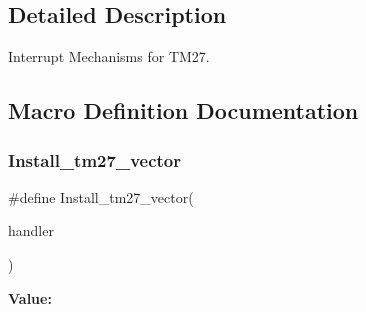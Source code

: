 \subsection{Detailed Description}
Interrupt Mechanisms for T\+M27. 



\subsection{Macro Definition Documentation}
\mbox{\label{group__ezkit533__tm27_gafb2d35f87c2bc11dcc6c700e9abbc183}} 
\subsubsection{\texorpdfstring{Install\_tm27\_vector}{Install\_tm27\_vector}}
{\footnotesize\ttfamily \#define Install\+\_\+tm27\+\_\+vector(\begin{DoxyParamCaption}\item[{}]{handler }\end{DoxyParamCaption})}

{\bfseries Value\+:}
\begin{DoxyCode}{0}
\DoxyCodeLine{\{ \(\backslash\)}
\DoxyCodeLine{\}}

\end{DoxyCode}
